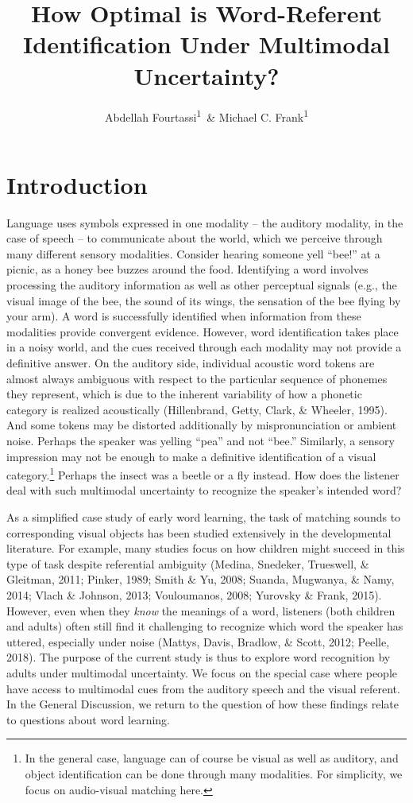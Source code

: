 \documentclass[english,floatsintext,man]{apa6}
\title{How Optimal is Word-Referent Identification Under Multimodal
Uncertainty?}
\author{Abdellah Fourtassi\textsuperscript{1}~\& Michael C. Frank\textsuperscript{1}}
\affiliation{
    \vspace{0.5cm}
          \textsuperscript{1} Department of Psychology, Stanford University  }
\theoremstyle{definition}
\theoremstyle{definition}
\theoremstyle{definition}
\theoremstyle{remark}
\begin{document}
\maketitle

\setcounter{secnumdepth}{0}



\section{Introduction}\label{introduction}

Language uses symbols expressed in one modality -- the auditory
modality, in the case of speech -- to communicate about the world, which
we perceive through many different sensory modalities. Consider hearing
someone yell \enquote{bee!} at a picnic, as a honey bee buzzes around
the food. Identifying a word involves processing the auditory
information as well as other perceptual signals (e.g., the visual image
of the bee, the sound of its wings, the sensation of the bee flying by
your arm). A word is successfully identified when information from these
modalities provide convergent evidence. However, word identification
takes place in a noisy world, and the cues received through each
modality may not provide a definitive answer. On the auditory side,
individual acoustic word tokens are almost always ambiguous with respect
to the particular sequence of phonemes they represent, which is due to
the inherent variability of how a phonetic category is realized
acoustically (Hillenbrand, Getty, Clark, \& Wheeler, 1995). And some
tokens may be distorted additionally by mispronunciation or ambient
noise. Perhaps the speaker was yelling \enquote{pea} and not
\enquote{bee.} Similarly, a sensory impression may not be enough to make
a definitive identification of a visual
category.\footnote{In the general case, language can of course be visual as well as auditory, and object identification can be done through many modalities. For simplicity, we focus on audio-visual matching here.}
Perhaps the insect was a beetle or a fly instead. How does the listener
deal with such multimodal uncertainty to recognize the speaker's
intended word?

As a simplified case study of early word learning, the task of matching
sounds to corresponding visual objects has been studied extensively in
the developmental literature. For example, many studies focus on how
children might succeed in this type of task despite referential
ambiguity (Medina, Snedeker, Trueswell, \& Gleitman, 2011; Pinker, 1989;
Smith \& Yu, 2008; Suanda, Mugwanya, \& Namy, 2014; Vlach \& Johnson,
2013; Vouloumanos, 2008; Yurovsky \& Frank, 2015). However, even when
they \emph{know} the meanings of a word, listeners (both children and
adults) often still find it challenging to recognize which word the
speaker has uttered, especially under noise (Mattys, Davis, Bradlow, \&
Scott, 2012; Peelle, 2018). The purpose of the current study is thus to
explore word recognition by adults under multimodal uncertainty. We
focus on the special case where people have access to multimodal cues
from the auditory speech and the visual referent. In the General
Discussion, we return to the question of how these findings relate to
questions about word learning.
\end{document}
